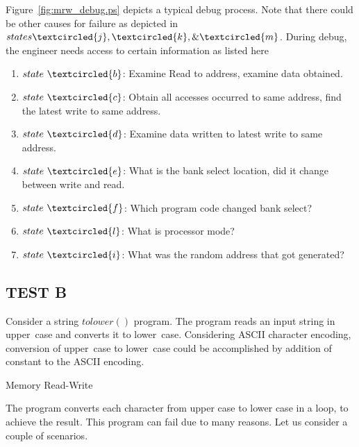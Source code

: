 Figure~\ref{fig:mrw_debug.ps} depicts a typical debug process. Note that there could be other causes for failure as depicted in $states \textcircled{j}, \textcircled{k}, \& \textcircled{m}$. During debug, the engineer needs access to certain information as listed here
\begin{enumerate}
\item $state~\textcircled{b}$: Examine Read to address, examine data obtained.
\item $state~\textcircled{c}$: Obtain all accesses occurred to same address, find the latest write to same address.
\item $state~\textcircled{d}$: Examine data written to latest write to same address.
\item $state~\textcircled{e}$: What is the bank select location, did it change between write and read.
\item $state~\textcircled{f}$: Which program code changed bank select?
\item $state~\textcircled{l}$: What is processor mode?
\item $state~\textcircled{i}$: What was the random address that got generated?
\end{enumerate}

\subsection {TEST B}
\label{case:testb}
Consider a string $tolower()$ program. The program reads an input string in upper~case and converts it to lower~case. Considering ASCII character encoding, conversion of upper~case to lower~case could be accomplished by addition of constant to the ASCII encoding.



\vspace{1.5cm}
\IncMargin{1em}
\begin{algorithm}[h]
\DontPrintSemicolon
{}

\BlankLine
 \;

\caption{Memory Read-Write}
\end{algorithm}\DecMargin{1em}

\vspace{1.5cm}

The program converts each character from upper case to lower case in a loop, to achieve the result. This program can fail due to many reasons. Let us consider a couple of scenarios.

